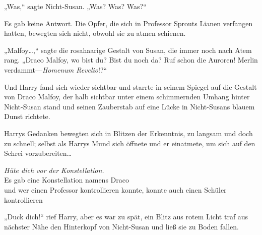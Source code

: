 „Was,“ sagte Nicht-Susan. „Was? Was? Was?“

Es gab keine Antwort. Die Opfer, die sich in Professor Sprouts Lianen verfangen hatten, bewegten sich nicht, obwohl sie zu atmen schienen.

„Malfoy…,“ sagte die rosahaarige Gestalt von Susan, die immer noch nach Atem rang.
„Draco Malfoy, wo bist du? Bist du noch da? Ruf schon die Auroren! Merlin verdammt—\emph{Homenum Revelio}!?“

Und Harry fand sich wieder sichtbar und starrte in seinem Spiegel auf die Gestalt von Draco Malfoy, der halb sichtbar unter einem schimmernden Umhang hinter Nicht-Susan stand und seinen Zauberstab auf eine Lücke in Nicht-Susans blauem Dunst richtete.

Harrys Gedanken bewegten sich in Blitzen der Erkenntnis, zu langsam und doch zu schnell; selbst als Harrys Mund sich öffnete und er einatmete, um sich auf den Schrei vorzubereiten…

\noindent{}\emph{Hüte dich vor der Konstellation.}\\
Es gab eine Konstellation namens Draco\\
und wer einen Professor kontrollieren konnte, konnte auch einen Schüler kontrollieren

„Duck dich!“ rief Harry, aber es war zu spät, ein Blitz aus rotem Licht traf aus nächster Nähe den Hinterkopf von Nicht-Susan und ließ sie zu Boden fallen.

